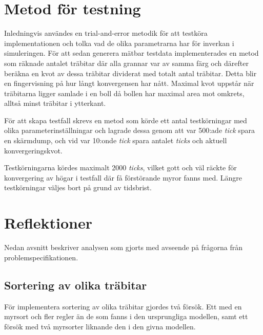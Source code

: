 \documentclass[titlepage, a4paper, 12pt]{article}
\begin{document}
\section{Metod för testning}\label{sec:metod-for-testning}

Inledningvis användes en trial-and-error metodik för att testköra
implementationen och tolka vad de olika parametrarna har för inverkan
i simuleringen. För att sedan generera mätbar testdata implementerades
en metod som räknade antalet träbitar där alla grannar var av samma
färg och därefter beräkna en kvot av dessa träbitar dividerat med
totalt antal träbitar. Detta blir en fingervisning på hur långt
konvergensen har nått. Maximal kvot uppstår när träbitarna ligger
samlade i en boll då bollen har maximal area mot omkrets, alltså minst
träbitar i ytterkant.

För att skapa testfall skrevs en metod som körde ett antal
testkörningar med olika parameterinställningar och lagrade dessa genom
att var 500:ade \textit{tick} spara en skärmdump, och vid var 10:onde
\textit{tick} spara antalet \textit{ticks} och aktuell
konvergeringskvot.

Testkörningarna kördes maximalt 2000 \textit{ticks}, vilket gott och
väl räckte för konvergering av högar i testfall där få förstörande
myror fanns med. Längre testkörningar väljes bort på grund av
tidsbrist.


\section{Reflektioner}
Nedan avsnitt beskriver analysen som gjorts med avseende på frågorna
från problemspecifikationen.

\subsection{Sortering av olika träbitar}
För implementera sortering av olika träbitar gjordes två försök. Ett
med en myrsort och fler regler än de som fanns i den ursprungliga
modellen, samt ett försök med två myrsorter liknande den i den givna
modellen.
\end{document}
